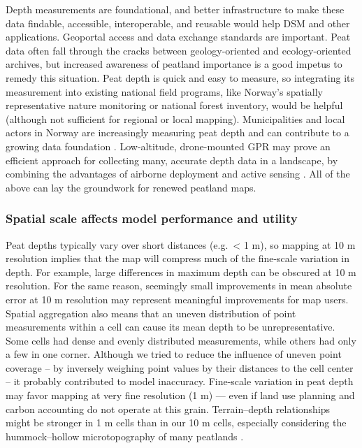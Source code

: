 \documentclass[soil, manuscript]{copernicus}
\begin{document}
Depth measurements are foundational, and better infrastructure to make these data findable, accessible, interoperable, and reusable would help DSM and other applications.
Geoportal access and data exchange standards \citeyearpar[like Natural England's for peat surveys,][]{naturalenglandDataExchangeStandard2023} are important.
Peat data often fall through the cracks between geology-oriented and ecology-oriented archives, but increased awareness of peatland importance is a good impetus to remedy this situation.
Peat depth is quick and easy to measure, so integrating its measurement into existing national field programs, like Norway's spatially representative nature monitoring or national forest inventory, would be helpful (although not sufficient for regional or local mapping).
Municipalities and local actors in Norway are increasingly measuring peat depth and can contribute to a growing data foundation \citep{kyrkjeeideCalculatorLocalPeatland2023}.
Low-altitude, drone-mounted GPR may prove an efficient approach for collecting many, accurate depth data in a landscape, by combining the advantages of airborne deployment and active sensing \citep{pelletierPeatAnalysesHudson1991, ruolsDevelopmentDronebasedGroundpenetrating2023}.
All of the above can lay the groundwork for renewed peatland maps.

\subsubsection{Spatial scale affects model performance and utility}

Peat depths typically vary over short distances (e.g.~\textless{} 1 m), so mapping at 10 m resolution implies that the map will compress much of the fine-scale variation in depth.
For example, large differences in maximum depth can be obscured at 10 m resolution.
For the same reason, seemingly small improvements in mean absolute error at 10 m resolution may represent meaningful improvements for map users.
Spatial aggregation also means that an uneven distribution of point measurements within a cell can cause its mean depth to be unrepresentative.
Some cells had dense and evenly distributed measurements, while others had only a few in one corner.
Although we tried to reduce the influence of uneven point coverage -- by inversely weighing point values by their distances to the cell center -- it probably contributed to model inaccuracy.
Fine-scale variation in peat depth may favor mapping at very fine resolution (1 m) --- even if land use planning and carbon accounting do not operate at this grain.
Terrain--depth relationships might be stronger in 1 m cells than in our 10 m cells, especially considering the hummock--hollow microtopography of many peatlands \citep{rydin7Mires1999, lindsayPeatbogsCarbonCritical2010}.
\end{document}
